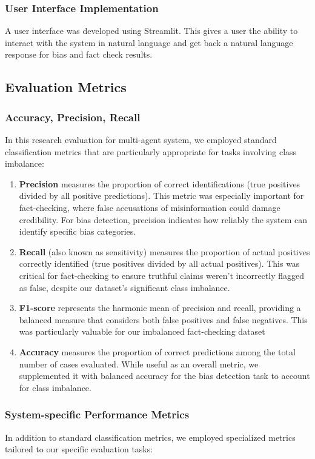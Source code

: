 \documentclass[11pt]{article}
\begin{document}
\subsubsection{User Interface Implementation}
A user interface was developed using Streamlit. This gives a user the ability to interact with the system in natural language and get back a natural language response for bias and fact check results. 

\subsection{Evaluation Metrics}
\subsubsection{Accuracy, Precision, Recall}
In this research evaluation for multi-agent system, we employed standard classification metrics that are particularly appropriate for tasks involving class imbalance:
\begin{enumerate}
    
    \item \textbf{Precision} measures the proportion of correct identifications (true positives divided by all positive predictions). This metric was especially important for fact-checking, where false accusations of misinformation could damage credibility. For bias detection, precision indicates how reliably the system can identify specific bias categories.
    \item \textbf{Recall} (also known as sensitivity) measures the proportion of actual positives correctly identified (true positives divided by all actual positives). This was critical for fact-checking to ensure truthful claims weren’t incorrectly flagged as false, despite our dataset’s significant class imbalance.
    \item \textbf{F1-score} represents the harmonic mean of precision and recall, providing a balanced measure that considers both false positives and false negatives. This was particularly valuable for our imbalanced fact-checking dataset 
    \item \textbf{Accuracy} measures the proportion of correct predictions among the total number of cases evaluated. While useful as an overall metric, we supplemented it with balanced accuracy for the bias detection task to account for class imbalance.
\end{enumerate}

\subsubsection{System-specific Performance Metrics}
In addition to standard classification metrics, we employed specialized metrics tailored to our specific evaluation tasks:
\end{document}
